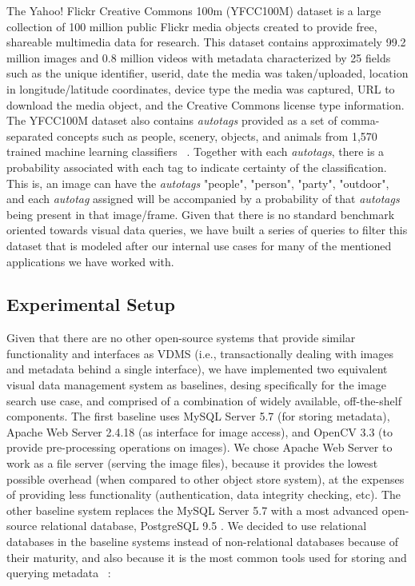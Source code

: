 The Yahoo! Flickr Creative Commons 100m (YFCC100M) dataset is a large
collection of 100 million public Flickr media objects created to provide free,
shareable multimedia data for research.
This dataset contains approximately 99.2 million images and 0.8 million videos
with metadata characterized by 25 fields such as the unique identifier, userid,
date the media was taken/uploaded, location in longitude/latitude coordinates,
device type the media was captured, URL to download the media object,
and the Creative Commons license type information.
The YFCC100M dataset also contains \textit{autotags}
provided as a set of comma-separated concepts such as people, scenery, objects,
and animals from 1,570 trained machine learning classifiers ~\cite{Thomee_2016}.
Together with each \textit{autotags}, there is a probability associated with
each tag to indicate certainty of the classification.
This is, an image can have the \textit{autotags} "people", "person", "party",
"outdoor", and each \textit{autotag} assigned will be accompanied by a
probability of that \textit{autotags} being present in that image/frame.
Given that there is no standard benchmark oriented towards visual data queries,
we have built a series of queries to filter this dataset that is modeled after
our internal use cases for many of the mentioned applications we have worked
with.

\subsection{Experimental Setup}
\label{setup}

Given that there are no other open-source systems that provide similar
functionality and interfaces as VDMS (i.e., transactionally dealing with images
and metadata behind a single interface), we have implemented two equivalent
visual data management system as baselines,
desing specifically for the image search use case,
and comprised of a combination of widely available, off-the-shelf components.
The first baseline uses MySQL Server 5.7 (for storing metadata),
Apache Web Server 2.4.18 (as interface for image access), and
OpenCV 3.3 (to provide pre-processing operations on images).
We chose Apache Web Server to work as a file server (serving the image files),
because it provides the lowest possible overhead
(when compared to other object store system), at the expenses of providing less
functionality (authentication, data integrity checking, etc).
The other baseline system replaces the MySQL Server 5.7 with a
most advanced open-source relational database, PostgreSQL 9.5 \cite{postgresql}.
We decided to use relational databases in the baseline systems instead of
non-relational databases because of their maturity, and also because it is
the most common tools used for storing and querying metadata
~\cite{Jatana2012, li_2019}:

